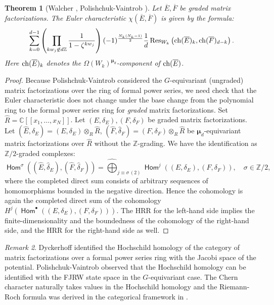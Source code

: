 \documentclass[11pt]{amsart}
\newtheorem{thm}{Theorem}[section] %
\theoremstyle{definition} %
\theoremstyle{remark} %
\newtheorem{rem}[thm]{Remark}%
\newcommand{\CC}{\mathbb C}
\newcommand{\ZZ}{\mathbb Z}
\newcommand{\Res}{\operatorname{Res}}
\newcommand{\ch}{{\rm ch}}
\def\nn{N}
\def\MF{\operatorname{\mathsf{MF}}}
\def\ol{\overline}
\newcommand{\bmu}{\boldsymbol{\mu}}
\newcommand{\hdelta}{\hat{\delta}}
\newcommand{\sfHom}{\operatorname{\mathsf{Hom}}}
\newcommand{\hR}{\widehat{R}}
\newcommand{\hE}{\widehat{E}}
\newcommand{\hF}{\widehat{F}}
\newcommand{\ov}{\overline}
\begin{document}
\begin{thm}[Walcher {\cite[\S 5]{Walcher}}, 
Polishchuk-Vaintrob {\cite[Theorem 4.2.1]{PVmf}}] 
\label{thm:HRR} 
Let 
$\ov{E},\ov{F}$ be graded matrix factorizations. 
The Euler characteristic 
$\chi( \ov{E},\ov{F})$ is given by 
the formula: 
\begin{equation}
\label{eq:HRR}
\sum_{k=0}^{d-1} 
\left( 
\prod_{kw_j\not \in d\ZZ} \frac{1}{1-\zeta^{kw_j}} 
\right) 
(-1)^{\frac{N_k(N_k-1)}{2}}
\frac{1}{d} 
\Res_{W_k}\left(\ch(\ol E)_k,\ch(\ol F)_{d-k}
\right). 
\end{equation} 
Here $\ch(\ov{E})_k$ denotes the $\Omega(W_k)^{\bmu_d}$-component 
of $\ch(\ov{E})$. 
\end{thm}
\begin{proof} 
Because Polishchuk-Vaintrob considered the $G$-equivariant 
(ungraded) matrix factorizations over the ring of formal power series,   
we need check that the Euler characteristic does 
not change under the base change from the polynomial 
ring to the formal power series ring for \emph{graded} 
matrix factorizations. 
Set $\hR =\CC[\![x_1,\dots,x_N]\!]$. 
Let  $(E,\delta_E), (F,\delta_F)$ be graded matrix factorizations.  
Let $(\hE,\hdelta_E) = (E,\delta_E) \otimes_R \hR$, 
$(\hF,\hdelta_F) = (F,\delta_F)\otimes_R \hR$ 
be $\bmu_d$-equivariant matrix factorizations over $\hR$ 
without the $\ZZ$-grading. 
We have the identification as $\ZZ/2$-graded 
complexes: 
\[
\sfHom^\sigma \left((\hE,\hdelta_E),(\hF,\hdelta_F) \right) = 
\mathbin{\widehat\bigoplus}_{j \equiv \sigma\, (2)} 
\sfHom^j((E,\delta_E),(F,\delta_F)), \quad 
\sigma \in \ZZ/2, 
\]
where the completed direct sum consists of 
arbitrary sequences of homomorphisms  
bounded in the negative direction. 
Hence the cohomology is again the completed 
direct sum of the cohomology $H^j(\sfHom^\bullet((E,\delta_E),(F,\delta_F)))$. 
The HRR for the left-hand side 
implies the finite-dimensionality and the boundedness 
of the cohomology of the right-hand side, and 
the HRR for the right-hand side as well. 
\end{proof}

\begin{rem}
Dyckerhoff \cite{Dyckerhoff} identified 
the Hochschild homology of the category of matrix factorizations 
over a formal power series ring 
with the Jacobi space of the potential.  
Polishchuk-Vaintrob \cite{PVmf} observed that the 
Hochschild homology can be identified with the 
FJRW state space in the $G$-equivariant case. 
The Chern character naturally takes values 
in the Hochschild homology and the Riemann-Roch 
formula was derived in the categorical framework 
in \cite{PVmf}. 
\end{rem} 
\end{document}
